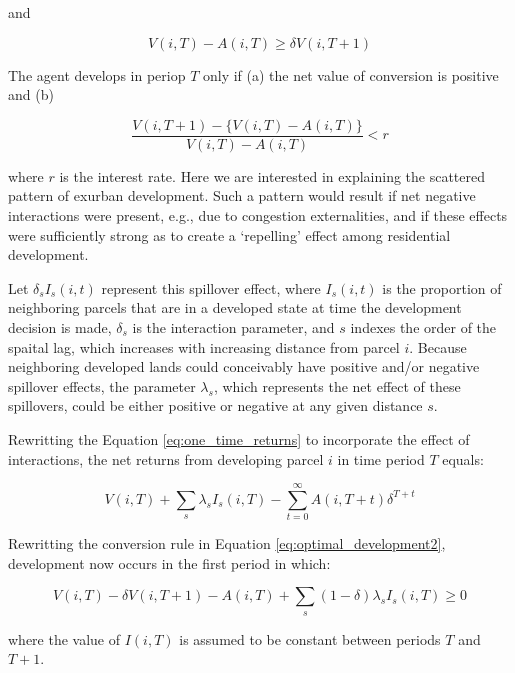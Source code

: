 and

\begin{equation}
    V(i, T) - A(i, T) \geq \delta V(i, T + 1) \label{eq:optimal_development2}
\end{equation}

The agent develops in periop $T$ only if (a) the net value of conversion is positive and (b)

\begin{equation*}
    \frac{V(i, T + 1) - \{V(i, T) - A(i, T)\}}{V(i, T) - A(i, T)} < r
\end{equation*}

where $r$ is the interest rate. Here we are interested in explaining the scattered pattern of exurban development. Such a pattern would result if net negative interactions were present, e.g., due to congestion externalities, and if these effects were sufficiently strong as to create a `repelling' effect among residential development.

Let $\delta_{s} I_s(i, t)$ represent this spillover effect, where $I_s(i, t)$ is the proportion of neighboring parcels that are in a developed state at time the development decision is made, $\delta_s$ is the interaction parameter, and $s$ indexes the order of the spaital lag, which increases with increasing distance from parcel $i$. Because neighboring developed lands could conceivably have positive and/or negative spillover effects, the parameter $\lambda_s$, which represents the net effect of these spillovers, could be either positive or negative at any given distance $s$.

Rewritting the Equation \eqref{eq:one_time_returns} to incorporate the effect of interactions, the net returns from developing parcel $i$ in time period $T$ equals:

\begin{equation}
    V(i, T) + \sum_{s} \lambda_s I_s(i, T) - \sum_{t=0}^\infty A(i, T + t) \delta^{T + t} \label{eq:one_time_returns_with_interactions}
\end{equation}

Rewritting  the conversion rule in Equation \eqref{eq:optimal_development2}, development now occurs in the first period in which:

\begin{equation}
    V(i, T) - \delta V(i, T + 1) - A(i, T) + \sum_s (1 - \delta) \lambda_s I_s(i, T) \geq 0 \label{eq:optimal_development_with_interactions}
\end{equation}

where the value of $I(i, T)$ is assumed to be constant between periods $T$ and $T + 1$. 

